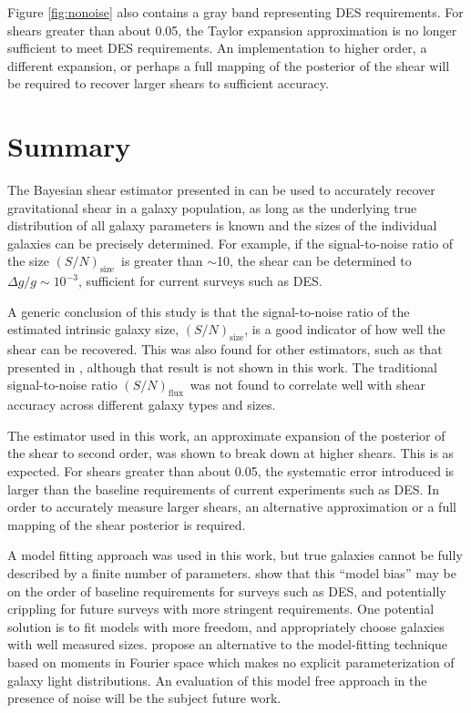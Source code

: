 \documentclass[12pt,preprint]{aastex}
\newcommand{\Tsn}{$(S/N)_{\textrm{size}}$}
\newcommand{\fsn}{$(S/N)_{\textrm{flux}}$}
\begin{document}
Figure \ref{fig:nonoise} also contains a gray band representing DES
requirements.  For shears greater than about 0.05, the Taylor expansion
approximation is no longer sufficient to meet DES requirements.  An
implementation to higher order, a different expansion, or perhaps a full
mapping of the posterior of the shear will be required to recover larger shears
to sufficient accuracy.

\section{Summary} \label{sec:summary}

The Bayesian shear estimator presented in \cite{ba14} can be used to accurately
recover gravitational shear in a galaxy population, as long as the underlying
true distribution of all galaxy parameters is known and the sizes of the
individual galaxies can be precisely determined.  For example, if the
signal-to-noise ratio of the size \Tsn\ is greater than $\sim$10, the shear
can be determined to $\Delta g/g \sim10^{-3}$, sufficient for current surveys such as DES.

A generic conclusion of this study is that the signal-to-noise ratio of the
estimated intrinsic galaxy size, \Tsn, is a good indicator of how well the
shear can be recovered.  This was also found for other estimators, such as that
presented in \cite{Miller07}, although that result is not shown in this work.
The traditional signal-to-noise ratio \fsn\ was not found to correlate well
with shear accuracy across different galaxy types and sizes.

The estimator used in this work, an approximate expansion of the posterior of
the shear to second order, was shown to break down at higher shears. This is as
expected.  For shears greater than about 0.05, the systematic error introduced
is larger than the baseline requirements of current experiments such as DES.
In order to accurately measure larger shears, an alternative approximation or a
full mapping of the shear posterior is required.

A model fitting approach was used in this work, but true galaxies cannot be
fully described by a finite number of parameters.  \cite{Kacprzak13} show that
this ``model bias'' may be on the order of baseline requirements for surveys
such as DES, and potentially crippling for future surveys with more stringent
requirements. One potential solution is to fit models with more freedom, and
appropriately choose galaxies with well measured sizes.  \cite{ba14} propose an
alternative to the model-fitting technique based on moments in Fourier space
which makes no explicit parameterization of galaxy light distributions.  An
evaluation of this model free approach in the presence of noise will be the
subject future work.
\end{document}
